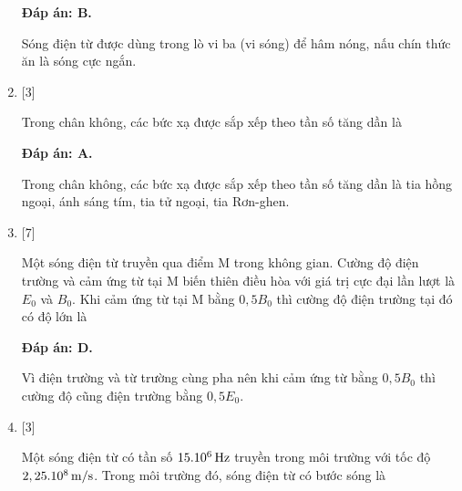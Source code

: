 \begin{enumerate}[label=\bfseries Câu \arabic*:]
	\loigiai
	{		\textbf{Đáp án: B.}
		
Sóng điện từ được dùng trong lò vi ba (vi sóng) để hâm nóng, nấu chín thức ăn là sóng cực ngắn.
		
	}

	\item {} [3] %
	
	\cauhoi
	{Trong chân không, các bức xạ được sắp xếp theo tần số tăng dần là
	}
	
	\loigiai
	{		\textbf{Đáp án: A.}
		
Trong chân không, các bức xạ được sắp xếp theo tần số tăng dần là tia hồng ngoại, ánh sáng tím, tia tử ngoại, tia Rơn-ghen.
		
	}

	\item {} [7] %
	
	\cauhoi
	{Một sóng điện từ truyền qua điểm M trong không gian. Cường độ điện trường và cảm ứng từ tại M biến thiên điều hòa với giá trị cực đại lần lượt là $E_0$ và $B_0$. Khi cảm ứng từ tại M bằng $ 0,5B_0$ thì cường độ điện trường tại đó có độ lớn là
	}
	
	\loigiai
	{		\textbf{Đáp án: D.}
		
Vì điện trường và từ trường cùng pha nên khi cảm ứng từ bằng $0,5B_0$ thì cường độ cũng điện trường bằng $0,5E_0$.
		
	}


	\item {} [3]
	
	\cauhoi
	{Một sóng điện từ có tần  số $\xsi{15.10^{6}}{Hz}$ truyền trong môi trường với tốc độ $\xsi{2,25.10^{8}}{m/s}$. Trong môi trường đó, sóng điện từ có bước sóng là
	}
	

\end{enumerate}

